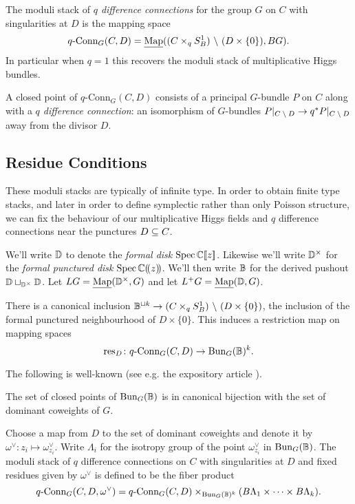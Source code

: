 \documentclass[10pt, oneside]{article}
\newcommand{\map}{\ul{\mr{Map}}}
\newcommand{\qconn}{q\text{-Conn}}
\begin{document}
\begin{definition}
The moduli stack of \emph{$q$ difference connections} for the group $G$ on $C$ with singularities at $D$ is the mapping space
\[\qconn_G(C,D) = \map((C \times_q S^1_B) \bs (D \times \{0\}), BG).\] 
In particular when $q=1$ this recovers the moduli stack of multiplicative Higgs bundles.
\end{definition}

\begin{remark}
A closed point of $\qconn_G(C,D)$ consists of a principal $G$-bundle $P$ on $C$ along with a \emph{$q$ difference connection}: an isomorphism of $G$-bundles $P|_{C \! \ \backslash \  \! D} \to q^*P|_{C \! \ \backslash \  \! D}$ away from the divisor $D$.
\end{remark}

\subsection{Residue Conditions}
These moduli stacks are typically of infinite type.  In order to obtain finite type stacks, and later in order to define symplectic rather than only Poisson structure, we can fix the behaviour of our multiplicative Higgs fields and $q$ difference connections near the punctures $D \subseteq C$.

We'll write $\mathbb{D}$ to denote the \emph{formal disk} $\operatorname{Spec} \mathbb{C}[\![z]\!]$.  Likewise we'll write $\mathbb{D}^\times$ for the \emph{formal punctured disk} $\operatorname{Spec} \mathbb{C}(\!(z)\!)$.  We'll then write $\mathbb{B}$ for the derived pushout $\mathbb{D} \sqcup_{\mathbb{D}^\times} \mathbb{D}$.  Let $LG = \map(\bb D^\times, G)$ and let $L^+G = \map(\bb D, G)$.

There is a canonical inclusion $\mathbb{B}^{\sqcup k} \to (C \times_q S^1_B) \ \backslash \  (D \times \{0\})$, the inclusion of the formal punctured neighbourhood of $D \times \{0\}$.  This induces a restriction map on mapping spaces
\[\res_D \colon \qconn_G(C, D) \to \bun_G(\bb B)^k.\]

The following is well-known (see e.g. the expository article \cite{Zhu}).

\begin{lemma}
The set of closed points of $\operatorname{Bun}_G(\mathbb{B})$ is in canonical bijection with the set of dominant coweights of $G$.
\end{lemma}

\begin{definition}
Choose a map from $D$ to the set of dominant coweights and denote it by $\omega^\vee \colon z_i \mapsto \omega^\vee_{z_i}$.  Write $\Lambda_i$ for the isotropy group of the point $\omega^\vee_{z_i}$ in $\operatorname{Bun}_G(\mathbb{B})$. The moduli stack of $q$ difference connections on $C$ with singularities at $D$ and fixed residues given by $\omega^\vee$ is defined to be the fiber product
\[\qconn_G(C,D, \omega^\vee) = \qconn_G(C,D) \times_{\bun_G(\bb B)^k} (B\Lambda_1 \times \cdots \times B\Lambda_k).\]
\end{definition}
\end{document}
